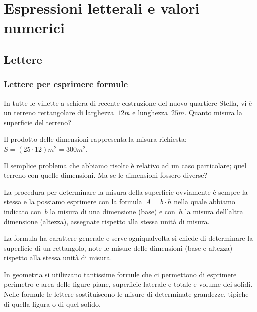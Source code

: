 \chapter{Espressioni letterali e valori numerici}
\section{Lettere}
\subsection{Lettere per esprimere formule}
\begin{exrig}
 \begin{esempio}
 In tutte le villette a schiera di recente costruzione del nuovo quartiere Stella, vi è un
terreno rettangolare di larghezza~$12\unit{m}$ e lunghezza~$25\unit{m}$. Quanto misura la superficie del terreno?
\begin{center}
 
\end{center}

Il prodotto delle dimensioni rappresenta la misura richiesta:~$S=(25\cdot 12)\unit{m}^{2}=300\unit{m}^2$.
 \end{esempio}
\end{exrig}

Il semplice problema che abbiamo risolto è relativo ad un caso particolare; quel terreno con
quelle dimensioni. Ma se le dimensioni fossero diverse?

La procedura per determinare la misura della superficie ovviamente è sempre la stessa e la possiamo esprimere con la
formula~$A=b\cdot h$ nella quale abbiamo indicato con~$b$ la misura di una dimensione (base) e con~$h$ la misura dell'altra
dimensione (altezza), assegnate rispetto alla stessa unità di misura.

\osservazione La formula ha carattere generale e serve ogniqualvolta si chiede di determinare la superficie di un rettangolo,
note le misure delle dimensioni (base e altezza) rispetto alla stessa unità di misura.

In geometria si utilizzano tantissime formule che ci permettono di esprimere perimetro e
area delle figure piane, superficie laterale e totale e volume dei solidi. Nelle formule le lettere sostituiscono le
misure di determinate grandezze, tipiche di quella figura o di quel solido.

\ovalbox{\risolvi \ref{ese:8.1}}

